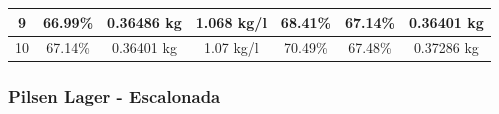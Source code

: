 \begin{longtable}{|p{1cm}|p{1.7cm}|p{2cm}|p{2cm}|p{2cm}| p{1cm}| p{1cm}|}
             \multicolumn{1}{|c|}{9} 
             & \multicolumn{1}{c|}{66.99\%}  
             & \multicolumn{1}{c|}{0.36486 kg} 
             & \multicolumn{1}{c|}{1.068 kg/l}
             & \multicolumn{1}{c|}{68.41\%}
             & \multicolumn{1}{c|}{67.14\%} 
             & \multicolumn{1}{c|}{0.36401 kg} 
             \\
             \hline
             
             \multicolumn{1}{|c|}{10} 
             & \multicolumn{1}{c|}{67.14\%} 
             & \multicolumn{1}{c|}{0.36401 kg} 
             & \multicolumn{1}{c|}{1.07 kg/l}
             & \multicolumn{1}{c|}{70.49\%}
             & \multicolumn{1}{c|}{67.48\%} 
             & \multicolumn{1}{c|}{0.37286 kg} 
             
             \\
             \hline
        
        \end{longtable}
        
    
 \subsubsection{Pilsen Lager - Escalonada}

